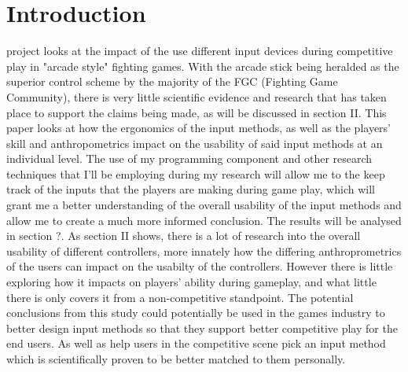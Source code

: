 \documentclass[journal]{IEEEtran}
\begin{document}
\section{Introduction}
% 
% 
% 
% 
 project looks at the impact of the use different input devices during competitive play in "arcade style" fighting games. With the arcade stick being heralded as the superior control scheme by the majority of the FGC (Fighting Game Community)\cite{stickvspad}, there is very little scientific evidence and research that has taken place to support the claims being made, as will be discussed in section II. This paper looks at how the ergonomics of the input methods, as well as the players' skill and anthropometrics impact on the usability of said input methods at an individual level. The use of my programming component and other research techniques that I'll be employing during my research will allow me to the keep track of the inputs that the players are making during game play, which will grant me a better understanding of the overall usability of the input methods and allow me to create a much more informed conclusion. The results will be analysed in section ?. As section II shows, there is a lot of research into the overall usability of different controllers, more innately how the differing anthroprometrics of the users can impact on the usabilty of the controllers. However there is little exploring how it impacts on players' ability during gameplay, and what little there is only covers it from a non-competitive standpoint. The potential conclusions from this study could potentially be used in the games industry to better design input methods so that they support better competitive play for the end users. As well as help users in the competitive scene pick an input method which is scientifically proven to be better matched to them personally. 
\end{document}
